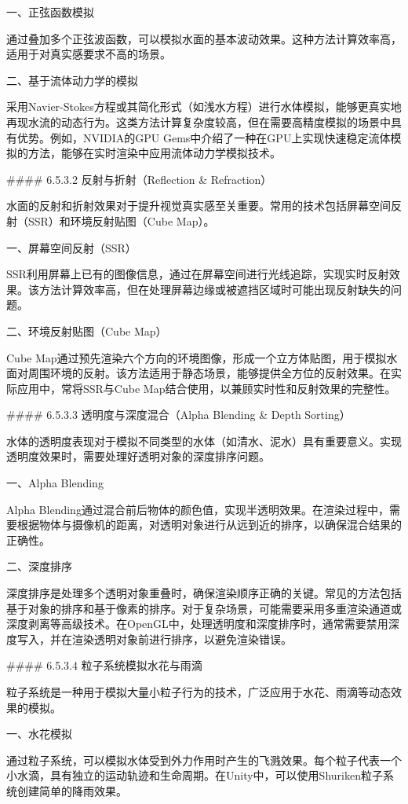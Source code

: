 一、正弦函数模拟

通过叠加多个正弦波函数，可以模拟水面的基本波动效果。这种方法计算效率高，适用于对真实感要求不高的场景。

二、基于流体动力学的模拟

采用Navier-Stokes方程或其简化形式（如浅水方程）进行水体模拟，能够更真实地再现水流的动态行为。这类方法计算复杂度较高，但在需要高精度模拟的场景中具有优势。例如，NVIDIA的GPU Gems中介绍了一种在GPU上实现快速稳定流体模拟的方法，能够在实时渲染中应用流体动力学模拟技术。

\#\#\#\# 6.5.3.2 反射与折射（Reflection \& Refraction）

水面的反射和折射效果对于提升视觉真实感至关重要。常用的技术包括屏幕空间反射（SSR）和环境反射贴图（Cube Map）。

一、屏幕空间反射（SSR）

SSR利用屏幕上已有的图像信息，通过在屏幕空间进行光线追踪，实现实时反射效果。该方法计算效率高，但在处理屏幕边缘或被遮挡区域时可能出现反射缺失的问题。

二、环境反射贴图（Cube Map）

Cube Map通过预先渲染六个方向的环境图像，形成一个立方体贴图，用于模拟水面对周围环境的反射。该方法适用于静态场景，能够提供全方位的反射效果。在实际应用中，常将SSR与Cube Map结合使用，以兼顾实时性和反射效果的完整性。

\#\#\#\# 6.5.3.3 透明度与深度混合（Alpha Blending \& Depth Sorting）

水体的透明度表现对于模拟不同类型的水体（如清水、泥水）具有重要意义。实现透明度效果时，需要处理好透明对象的深度排序问题。

一、Alpha Blending

Alpha Blending通过混合前后物体的颜色值，实现半透明效果。在渲染过程中，需要根据物体与摄像机的距离，对透明对象进行从远到近的排序，以确保混合结果的正确性。

二、深度排序

深度排序是处理多个透明对象重叠时，确保渲染顺序正确的关键。常见的方法包括基于对象的排序和基于像素的排序。对于复杂场景，可能需要采用多重渲染通道或深度剥离等高级技术。在OpenGL中，处理透明度和深度排序时，通常需要禁用深度写入，并在渲染透明对象前进行排序，以避免渲染错误。

\#\#\#\# 6.5.3.4 粒子系统模拟水花与雨滴

粒子系统是一种用于模拟大量小粒子行为的技术，广泛应用于水花、雨滴等动态效果的模拟。

一、水花模拟

通过粒子系统，可以模拟水体受到外力作用时产生的飞溅效果。每个粒子代表一个小水滴，具有独立的运动轨迹和生命周期。在Unity中，可以使用Shuriken粒子系统创建简单的降雨效果。

